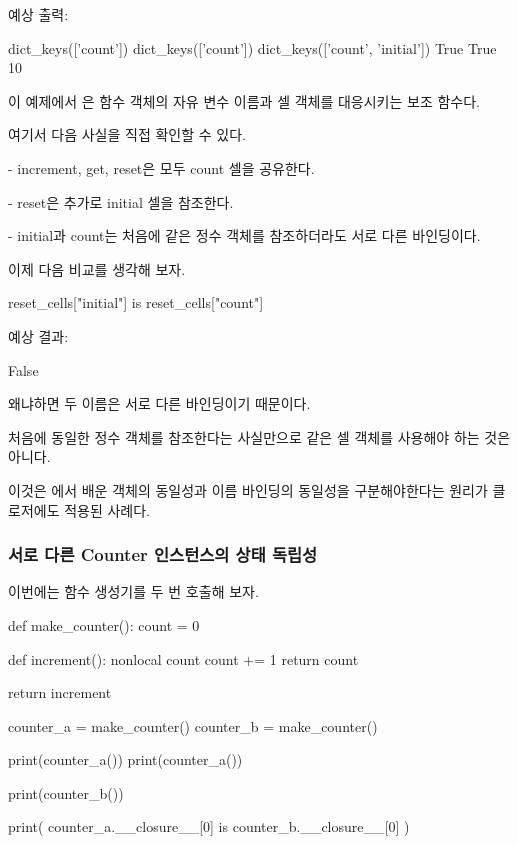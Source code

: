 예상 출력:

\begin{dhkzsh}
dict_keys(['count'])
dict_keys(['count'])
dict_keys(['count', 'initial'])
True
True
10
\end{dhkzsh}

이 예제에서 은 함수 객체의 자유 변수 이름과 셀 객체를 대응시키는 보조 함수다.

여기서 다음 사실을 직접 확인할 수 있다.

\begin{dhksmry}
    - increment, get, reset은 모두 count 셀을 공유한다.

    - reset은 추가로 initial 셀을 참조한다.

    - initial과 count는 처음에 같은 정수 객체를 참조하더라도
      서로 다른 바인딩이다.
\end{dhksmry}

이제 다음 비교를 생각해 보자.

\begin{dhkcode}
reset_cells["initial"] is reset_cells["count"]
\end{dhkcode}

예상 결과:

\begin{dhkzsh}
False
\end{dhkzsh}

왜냐하면 두 이름은 서로 다른 바인딩이기 때문이다.

처음에 동일한 정수 객체를 참조한다는 사실만으로 같은 셀 객체를 사용해야 하는 것은 아니다.

이것은 에서 배운 객체의 동일성과 이름 바인딩의 동일성을 구분해야한다는 원리가 클로저에도 적용된 사례다.

\subsubsection{서로 다른 Counter 인스턴스의 상태 독립성}

이번에는 함수 생성기를 두 번 호출해 보자.

\begin{dhkcode}
def make_counter():
    count = 0

    def increment():
        nonlocal count
        count += 1
        return count

    return increment


counter_a = make_counter()
counter_b = make_counter()

print(counter_a())
print(counter_a())

print(counter_b())

print(
    counter_a.__closure__[0]
    is counter_b.__closure__[0]
)
\end{dhkcode}

